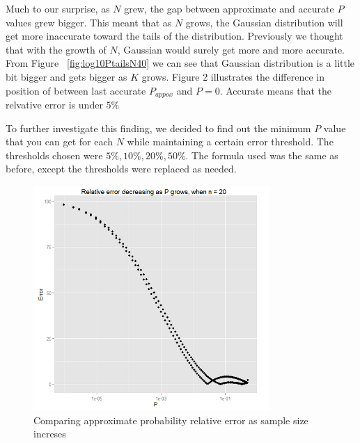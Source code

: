 \documentclass[12pt]{article}
\begin{document}
Much to our surprise, as $N$ grew, the gap between approximate and accurate $P$ values grew bigger. This meant that as $N$ grows, the Gaussian distribution will get more inaccurate toward the tails of the distribution. Previously we thought that with the growth of $N$, Gaussian would surely get more and more accurate.
From Figure ~\ref{fig:log10PtailsN40} we can see that Gaussian distribution is a little bit bigger and gets bigger as $K$ grows. Figure 2 illustrates the difference in position of between last accurate $P_{appox}$ and $P = 0$. Accurate means that the relvative error is under $5\%$

To further investigate this finding, we decided to find out the minimum $P$ value that you can get for each $N$ while maintaining a certain error threshold. The thresholds chosen were $5\%, 10\%, 20\%, 50\%$. The formula used was the same as before, except the thresholds were replaced as needed.

\begin{figure}[!h]
	\centering
  \includegraphics[width=0.8\textwidth]{RelativeErrorDecreasingPgrowsN20}
	\caption{Comparing approximate probability relative error as sample size increses}
	\label{fig:PvsN}
\end{figure}
\end{document}
